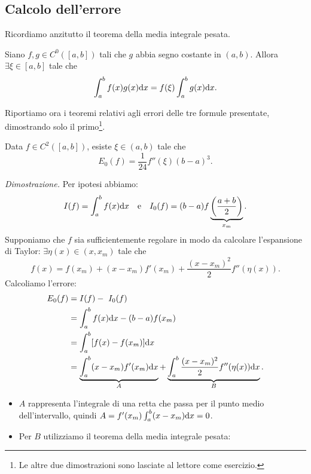 \subsection{Calcolo dell'errore}
Ricordiamo anzitutto il teorema della media integrale pesata.
\begin{theorem}
Siano $f,g\in C^{0}([ a,b])$ tali che $g$ abbia segno costante in $( a,b)$.
Allora $\exists \xi \in [ a,b]$ tale che
\begin{equation*}
\int\nolimits ^{b}_{a} f(x) g(x) \mathrm d x=f( \xi )\int\nolimits ^{b}_{a} g(x) \mathrm d x.
\end{equation*}
\end{theorem}
Riportiamo ora i teoremi relativi agli errori delle tre formule presentate, dimostrando solo il primo\footnote{Le altre due dimostrazioni sono lasciate al lettore come esercizio.}.
\begin{theorem}
Data $f\in C^{2}([ a,b])$, esiste $\xi \in ( a,b)$ tale che
\begin{equation*}
E_{0}(f) =\frac{1}{24} f''( \xi )( b-a)^{3}.
\end{equation*}
\end{theorem}
\textit{Dimostrazione.}
Per ipotesi abbiamo:
\begin{equation*}
I(f) =\int\nolimits ^{b}_{a} f(x) \mathrm d x \quad \text e \quad I_{0}(f) =( b-a) f\underbrace{\left(\frac{a+b}{2}\right)}_{x_{m}}.
\end{equation*}
Supponiamo che $f$ sia sufficientemente regolare in modo da calcolare l'espansione di Taylor: $\exists \eta (x) \in ( x,x_{m})$ tale che
\begin{equation*}
f(x) =f( x_{m}) +( x-x_{m}) f'( x_{m}) +\frac{( x-x_{m})^{2}}{2} f''( \eta (x)).
\end{equation*}
Calcoliamo l'errore:
\begin{align*}
E_{0}(f) &= I(f) -\ I_{0}(f) \\
  &=\int\nolimits ^{b}_{a} f(x) \mathrm d x-( b-a) f( x_{m})\\
  &=\int\nolimits ^{b}_{a}[ f(x) -f( x_{m})] \mathrm d x\\
  &=\underbrace{\int\nolimits ^{b}_{a}( x-x_{m}) f'( x_{m}) \mathrm d x}_{A} +\underbrace{\int\nolimits ^{b}_{a}\frac{( x-x_{m})^{2}}{2} f''( \eta (x)) \mathrm d x}_{B}.
\end{align*}
\begin{itemize}
\item $A$ rappresenta l'integrale di una retta che passa per il punto medio dell'intervallo, quindi $A=f'( x_{m})\int\nolimits ^{b}_{a}( x-x_{m}) \mathrm d x=0$.
\item Per $B$ utilizziamo il teorema della media integrale pesata:
\end{itemize}
